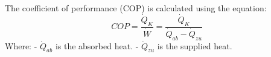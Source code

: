 The coefficient of performance (COP) is calculated using the equation:  
\[ COP = \frac{\dot{Q}_K}{\dot{W}} = \frac{\dot{Q}_K}{\dot{Q}_{ab} - \dot{Q}_{zu}} \]  
Where:  
- \( \dot{Q}_{ab} \) is the absorbed heat.  
- \( \dot{Q}_{zu} \) is the supplied heat.